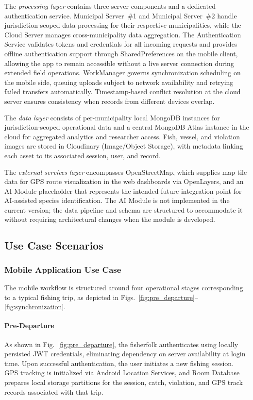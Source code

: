 \documentclass[journal]{IEEEtran}
\begin{document}
The \textit{processing layer} contains three server components and a dedicated
authentication service. Municipal Server~\#1 and Municipal Server~\#2 handle
jurisdiction-scoped data processing for their respective municipalities, while the Cloud
Server manages cross-municipality data aggregation. The Authentication Service validates
tokens and credentials for all incoming requests and provides offline authentication
support through SharedPreferences on the mobile client, allowing the app to
remain accessible without a live server connection during extended field operations.
WorkManager governs synchronization scheduling on the mobile side, queuing uploads
subject to network availability and retrying failed transfers automatically.
Timestamp-based conflict resolution at the cloud server ensures consistency when records
from different devices overlap.

The \textit{data layer} consists of per-municipality local MongoDB instances for
jurisdiction-scoped operational data and a central MongoDB Atlas instance in the cloud
for aggregated analytics and researcher access. Fish, vessel, and violation images are
stored in Cloudinary (Image/Object Storage), with metadata linking each asset to its
associated session, user, and record.

The \textit{external services layer} encompasses OpenStreetMap, which supplies map tile
data for GPS route visualization in the web dashboards via OpenLayers, and an AI Module
placeholder that represents the intended future integration point for AI-assisted species
identification. The AI Module is not implemented in the current version; the data
pipeline and schema are structured to accommodate it without requiring architectural
changes when the module is developed.

\subsection{Use Case Scenarios}

\subsubsection{Mobile Application Use Case}

The mobile workflow is structured around four operational stages corresponding to a
typical fishing trip, as depicted in Figs.~\ref{fig:pre_departure}--\ref{fig:synchronization}.

\paragraph{Pre-Departure}
As shown in Fig.~\ref{fig:pre_departure}, the fisherfolk authenticates using locally
persisted JWT credentials, eliminating dependency on server availability at login time.
Upon successful authentication, the user initiates a new fishing session. GPS tracking is
initialized via Android Location Services, and Room Database prepares local storage
partitions for the session, catch, violation, and GPS track records associated with that
trip.
\end{document}
